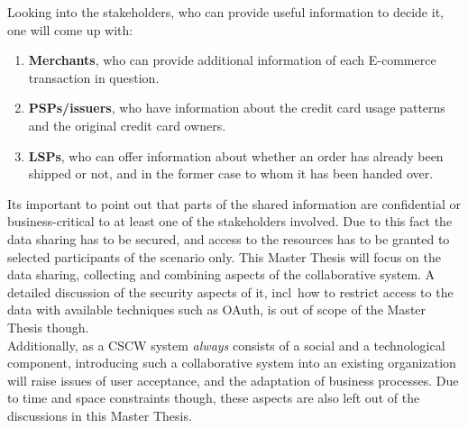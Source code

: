 Looking into the stakeholders, who can provide useful information to decide it, one will come up with:\@

\begin{enumerate}
    \item \textbf{Merchants}, who can provide additional information of each \gls{E-commerce} transaction in question.
    \item \textbf{\gls{PSP}s/issuers}, who have information about the credit card usage patterns and the original credit card owners.
    \item \textbf{\gls{LSP}s}, who can offer information about whether an order has already been shipped or not, and in the former case to whom it has been handed over.
\end{enumerate}

Its important to point out that parts of the shared information are confidential or business-critical to at least one of the stakeholders involved. Due to this fact the data sharing has to be secured, and access to the resources has to be granted to selected participants of the scenario only. This Master Thesis will focus on the data sharing, collecting and combining aspects of the collaborative system. A detailed discussion of the security aspects of it, \gls{incl}\ how to restrict access to the data with available techniques such as \gls{OAuth}, is out of scope of the Master Thesis though.\\

Additionally, as a \gls{CSCW} system \emph{always} consists of a social and a technological component, introducing such a collaborative system into an existing organization will raise issues of user acceptance, and the adaptation of business processes. Due to time and space constraints though, these aspects are also left out of the discussions in this Master Thesis.

